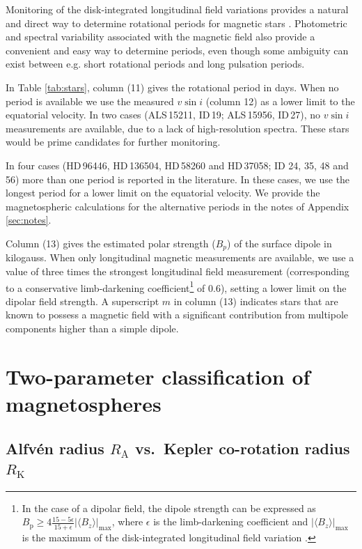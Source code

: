 \documentclass[useAMS,usenatbib]{mn2e}
\newcommand{\ra}{R_\mathrm{A}}
\newcommand{\rk}{R_\mathrm{K}}
\newcommand{\vsini}{v \sin i}
\newcommand{\bp}{B_\mathrm{p}}
\newcommand{\mbl}{\langle B_{z}\rangle}
\begin{document}
Monitoring of the disk-integrated longitudinal field variations provides a natural and direct way to determine rotational periods for magnetic stars \citep[in the context of the Oblique Rotator Model; e.g.][]{1950MNRAS.110..395S}. Photometric and spectral variability associated with the magnetic field also provide a convenient and easy way to determine periods, even though some ambiguity can exist between e.g. short rotational periods and long pulsation periods. 


In Table \ref{tab:stars}, column (11) gives the rotational period in days. When no period is available we use the measured $\vsini$ (column 12) as a lower limit to the equatorial velocity. In two cases (ALS\,15211, ID\,19; ALS\,15956, ID\,27), no $\vsini$ measurements are available, due to a lack of high-resolution spectra.
These stars would be prime candidates for further monitoring. 


In four cases (HD\,96446,  HD\,136504, HD\,58260 and HD\,37058; ID 24, 35, 48 and 56) more than one period is reported in the literature. In these cases, we use the longest period for a lower limit on the equatorial velocity. We provide the magnetospheric calculations for the alternative periods in the notes of Appendix \ref{sec:notes}. 


Column (13) gives the estimated polar strength ($B_p$) of the surface dipole in kilogauss. When only longitudinal magnetic measurements are available, we use a value of three times the strongest longitudinal field measurement (corresponding to a conservative limb-darkening coefficient\footnote{In the case of a dipolar field, the dipole strength can be expressed as $\bp\geq 4\frac{15-5\epsilon}{15+\epsilon}|\mbl |_\mathrm{max}$, where $\epsilon$ is the limb-darkening coefficient and $|\mbl|_\mathrm{max}$ is the maximum of the disk-integrated longitudinal field variation \citep{1967ApJ...150..547P}.} of 0.6), setting a lower limit on the dipolar field strength. A superscript $m$ in column (13) indicates stars that are known to possess a magnetic field with a significant contribution from multipole components higher than a simple dipole. 




\section{Two-parameter classification of magnetospheres}
\label{sec:theo}

\subsection{Alfv\'en radius $\ra$ vs.\ Kepler co-rotation radius $\rk$}
\label{sec:mcp}
\end{document}
